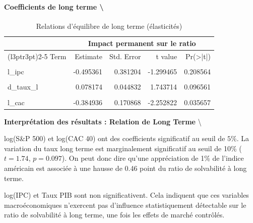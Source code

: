 \documentclass[
]{article}
\begin{document}
\paragraph{Coefficients de long terme
\textbackslash{}}\label{coefficients-de-long-terme}

\begin{table}[!h]
\centering
\caption{\label{tab:unnamed-chunk-29}Relations d'équilibre de long terme (élasticités)}
\centering
\begin{tabular}[t]{lrrrr}
\toprule
\multicolumn{1}{c}{ } & \multicolumn{4}{c}{Impact permanent sur le ratio} \\
\cmidrule(l{3pt}r{3pt}){2-5}
Term & Estimate & Std. Error & t value & Pr(>|t|)\\
\midrule
\cellcolor{gray!10}{(Intercept)} & \cellcolor{gray!10}{4.170834} & \cellcolor{gray!10}{1.146195} & \cellcolor{gray!10}{3.638852} & \cellcolor{gray!10}{0.001634}\\
l\_ipc & -0.495361 & 0.381204 & -1.299465 & 0.208564\\
\cellcolor{gray!10}{taux\_pib} & \cellcolor{gray!10}{-0.414510} & \cellcolor{gray!10}{0.288020} & \cellcolor{gray!10}{-1.439173} & \cellcolor{gray!10}{0.165569}\\
d\_taux\_l & 0.078174 & 0.044832 & 1.743714 & 0.096561\\
\cellcolor{gray!10}{l\_sp} & \cellcolor{gray!10}{0.455041} & \cellcolor{gray!10}{0.115656} & \cellcolor{gray!10}{3.934451} & \cellcolor{gray!10}{0.000820}\\
\addlinespace
l\_cac & -0.384936 & 0.170868 & -2.252822 & 0.035657\\
\bottomrule
\end{tabular}
\end{table}

\textbf{Interprétation des résultats : Relation de Long Terme}
\textbackslash{}

log(S\&P 500) et log(CAC 40) ont des coefficients significatif au seuil
de \(5\%\). La variation du taux long terme est marginalement
significatif au seuil de 10\% (\(t = 1.74\), \(p = 0.097\)). On peut
donc dire qu'une appréciation de 1\% de l'indice américain est associée
à une hausse de 0.46 point du ratio de solvabilité à long terme.

log(IPC) et Taux PIB sont non significativent. Cela indiquent que ces
variables macroéconomiques n'exercent pas d'influence statistiquement
détectable sur le ratio de solvabilité à long terme, une fois les effets
de marché contrôlés.
\end{document}
